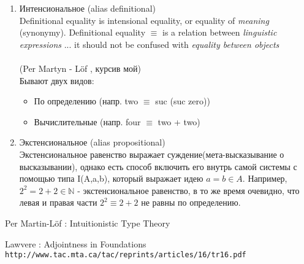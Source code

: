 \documentclass[10pt,a4paper]{article}
\theoremstyle{definition}
\begin{document}
\begin{enumerate}
\item Интенсиональное (alias definitional)\\

  Definitional equality is intensional equality, or equality of \textit{meaning} (synonymy). Definitional equality $\equiv$ is a relation between \textit{linguistic expressions} ... it should not be confused with \textit{equality between objects}\\ \\
  (Per Martyn - L{\"o}f \cite{PML1980}, курсив мой)\\

    Бывают двух видов:
    \begin{itemize}
  \item По определению (напр. two $\equiv$ suc (suc zero))
  \item Вычислительные (напр. four $\equiv$ two + two)
    \end{itemize}

\item Экстенсиональное (alias propositional) \\
  Экстенсиональное равенство выражает суждение(мета-высказывание о высказывании), однако есть способ включить его внутрь самой системы с помощью типа I(A,a,b), который выражает идею $a = b \in A$. Например, $ 2^2 = 2 + 2 \in \mathbb{N} $ - экстенсиональное равенство, в то же время очевидно, что левая и правая части  $2^2 \equiv 2 + 2 $ не равны по определению.\\

\end{enumerate}

\newpage


\begin{thebibliography}{9}

Per Martin-Löf : Intuitionistic Type Theory

Lawvere : Adjointness in Foundations
\\\texttt{http://www.tac.mta.ca/tac/reprints/articles/16/tr16.pdf}

\end{thebibliography}
 
\end{document}
